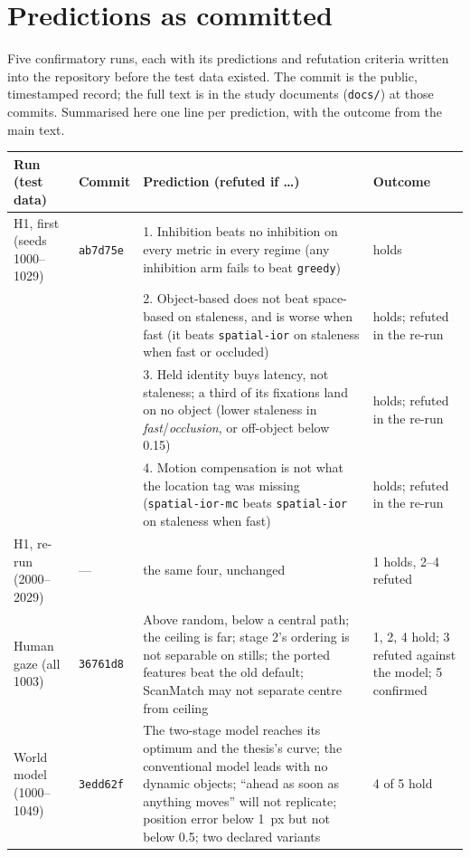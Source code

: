 \documentclass[11pt,a4paper]{article}
\newcommand{\arm}[1]{\texttt{#1}}
\begin{document}
\section{Predictions as committed}
\label{app:predictions}
Five confirmatory runs, each with its predictions and refutation criteria
written into the repository before the test data existed. The commit is the
public, timestamped record; the full text is in the study documents
(\texttt{docs/}) at those commits. Summarised
here one line per prediction, with the outcome from the main text.

\begin{center}\scriptsize
\begin{tabularx}{\linewidth}{@{}p{22mm}lXp{22mm}@{}}
\toprule
Run (test data) & Commit & Prediction (refuted if \ldots) & Outcome \\
\midrule
H1, first (seeds 1000--1029) & \texttt{ab7d75e} & 1. Inhibition beats no inhibition on every metric in every regime (any inhibition arm fails to beat \arm{greedy}) & holds \\
 & & 2. Object-based does not beat space-based on staleness, and is worse when fast (it beats \arm{spatial-ior} on staleness when fast or occluded) & holds; refuted in the re-run \\
 & & 3. Held identity buys latency, not staleness; a third of its fixations land on no object (lower staleness in \emph{fast}/\emph{occlusion}, or off-object below 0.15) & holds; refuted in the re-run \\
 & & 4. Motion compensation is not what the location tag was missing (\arm{spatial-ior-mc} beats \arm{spatial-ior} on staleness when fast) & holds; refuted in the re-run \\
\addlinespace
H1, re-run (2000--2029) & --- & the same four, unchanged & 1 holds, 2--4 refuted \\
\addlinespace
Human gaze (all 1003) & \texttt{36761d8} & Above random, below a central path; the ceiling is far; stage 2's ordering is not separable on stills; the ported features beat the old default; ScanMatch may not separate centre from ceiling & 1, 2, 4 hold; 3 refuted against the model; 5 confirmed \\
\addlinespace
World model (1000--1049) & \texttt{3edd62f} & The two-stage model reaches its optimum and the thesis's curve; the conventional model leads with no dynamic objects; ``ahead as soon as anything moves'' will not replicate; position error below 1~px but not below 0.5; two declared variants & 4 of 5 hold \\

\end{tabularx}
\end{center}
\end{document}
